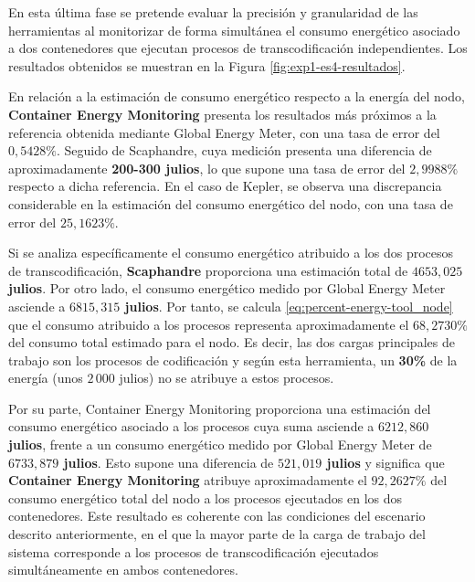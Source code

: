  

 En esta última fase se pretende evaluar la precisión y granularidad de las herramientas al monitorizar de forma simultánea el consumo energético asociado a dos contenedores que ejecutan procesos de transcodificación independientes. Los resultados obtenidos se muestran en la Figura \ref{fig:exp1-es4-resultados}.

 

 En relación a la estimación de consumo energético respecto a la energía del nodo, \textbf{Container Energy Monitoring} presenta los resultados más próximos a la referencia obtenida mediante Global Energy Meter, con una tasa de error del \textbf{$0,5428\%$}. Seguido de Scaphandre, cuya medición presenta una diferencia de aproximadamente \textbf{200-300 julios}, lo que supone una tasa de error del \textbf{$2,9988\%$} respecto a dicha referencia. En el caso de Kepler, se observa una discrepancia considerable en la estimación del consumo energético del nodo, con una tasa de error del \textbf{$25,1623\%$}. 

 

 Si se analiza específicamente el consumo energético atribuido a los dos procesos de transcodificación, \textbf{Scaphandre} proporciona una estimación total de \textbf{$4653,025$ julios}. Por otro lado, el consumo energético medido por Global Energy Meter asciende a \textbf{$6815,315$ julios}. Por tanto, se calcula \ref{eq:percent-energy-tool_node} que el consumo atribuido a los procesos representa aproximadamente el \textbf{$68,2730\%$} del consumo total estimado para el nodo. Es decir, las dos cargas principales de trabajo son los procesos de codificación y según esta herramienta, un \textbf{30\%} de la energía (unos $2\,000$ julios) no se atribuye a estos procesos.

 

 Por su parte, Container Energy Monitoring proporciona una estimación del consumo energético asociado a los procesos cuya suma asciende a \textbf{$6212,860$ julios}, frente a un consumo energético medido por  Global Energy Meter de \textbf{$6733,879$ julios}. Esto supone una diferencia de \textbf{$521,019$ julios} y significa que \textbf{Container Energy Monitoring} atribuye aproximadamente el \textbf{$92,2627\%$} del consumo energético total del nodo a los procesos ejecutados en los dos contenedores. Este resultado es coherente con las condiciones del escenario descrito anteriormente, en el que la mayor parte de la carga de trabajo del sistema corresponde a los procesos de transcodificación ejecutados simultáneamente en ambos contenedores.

